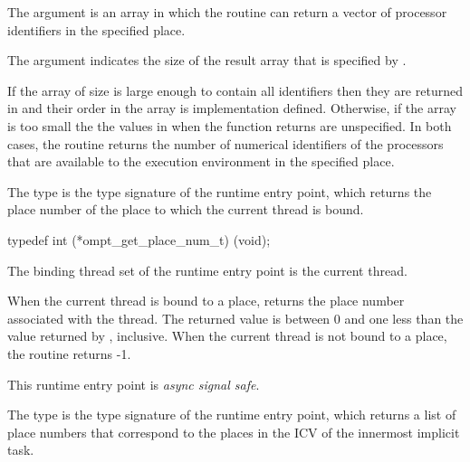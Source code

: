The  argument is an array in which the routine can return
a vector of processor identifiers in the specified place.

The  argument indicates the size of the result array that
is specified by .

\effect
If the  array of size  is large enough to contain 
all identifiers then they are returned in  and their order in the 
array is implementation defined. Otherwise, if the  array is too 
small the the values in  when the function returns are unspecified.
In both cases, the routine returns the number of numerical identifiers of 
the processors that are available to the execution environment in the specified place.



\label{sec:ompt_get_place_num_t}
\label{sec:ompt_get_place_num}

\summary
The  type is the type signature of the 
 runtime entry point, which returns the
place number of the place to which the current thread is bound.

\format
\begin{ccppspecific}
\begin{omptInquiry}
typedef int (*ompt_get_place_num_t) (void);
\end{omptInquiry}
\end{ccppspecific}

\binding
The binding thread set of the  runtime entry point
is the current thread.

\descr
When the current thread is bound to a place, 
returns the place number associated with the thread. The returned value 
is between 0 and one less than the value returned by , 
inclusive. When the current thread is not bound to a place, the routine returns -1.

This runtime entry point is \emph{async signal safe}.



\label{sec:ompt_get_partition_place_nums_t}
\label{sec:ompt_get_partition_place_nums}

\summary
The  type is the type signature 
of the  runtime entry point, which 
returns a list of place numbers that correspond to the places in the 
 ICV of the innermost implicit task.

